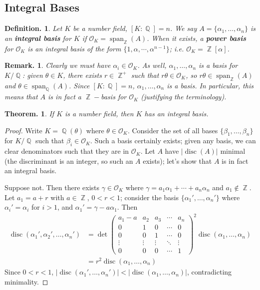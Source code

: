 \documentclass[11pt, a4paper]{memoir}
\DeclareMathOperator{\Q}{{\mathbb{Q}}}
\DeclareMathOperator{\Z}{{\mathbb{Z}}}
\theoremstyle{change}
\newtheorem{theorem}{Theorem.}[section]
\theoremstyle{plain}
\theoremstyle{nonumberplain}
\newtheorem{definition}{Definition.}
\newtheorem{remark}{Remark.}
\newtheorem{proof}{Proof}
\DeclareMathOperator{\disc}{disc}
\DeclareMathOperator{\spn}{span}
\newcommand{\mbf}[1]{{\boldmath\bfseries #1}}
\numberwithin{equation}{section}
\begin{document}
\subsection{Integral Bases}
\begin{definition}
    Let $K$ be a number field, $[K:\Q]=n$.
    We say $A=\{\alpha_1,\ldots,\alpha_n\}$ is an \mbf{integral basis} for $K$ if $\mathcal{O}_K=\spn_{\Z}(A)$.
    When it exists, a \mbf{power basis} for $\mathcal{O}_K$ is an integral basis of the form $\{1,\alpha,\cdots,\alpha^{n-1}\}$; i.e. $\mathcal{O}_K=\Z[\alpha]$.
\end{definition}
\begin{remark}
    Clearly we must have $\alpha_i\in\mathcal{O}_K$.
    As well, $\alpha_1,\ldots,\alpha_n$ is a basis for $K/\Q$: given $\theta\in K$, there exists $r\in\Z^+$ such that $r\theta\in\mathcal{O}_K$, so $r\theta\in\spn_{\Z}(A)$ and $\theta\in\spn_{\Q}(A)$.
    Since $[K:\Q]=n$, $\alpha_1,\ldots,\alpha_n$ is a basis.
    In particular, this means that $A$ is in fact a $\Z-$basis for $\mathcal{O}_K$ (justifying the terminology).
\end{remark}
\begin{theorem}
    If $K$ is a number field, then $K$ has an integral basis.
\end{theorem}
\begin{proof}
    Write $K=\Q(\theta)$ where $\theta\in\mathcal{O}_K$.
    Consider the set of all bases $\{\beta_1,\ldots,\beta_n\}$ for $K/\Q$ such that $\beta_i\in\mathcal{O}_K$.
    Such a basis certainly exists; given any basis, we can clear denominators such that they are in $\mathcal{O}_K$.
    Let $A$ have $|\disc(A)|$ minimal (the discriminant is an integer, so such an $A$ exists); let's show that $A$ is in fact an integral basis.

    Suppose not.
    Then there exists $\gamma\in\mathcal{O}_K$ where $\gamma=a_1\alpha_1+\cdots+a_n\alpha_n$ and $a_1\notin\Z$.
    Let $a_1=a+r$ with $a\in\Z$, $0<r<1$; consider the basis $\{\alpha_1',\ldots,\alpha_n'\}$ where $\alpha_i'=\alpha_i$ for $i>1$, and $\alpha_1'=\gamma-a\alpha_1$.
    Then
    \begin{align*}
        \disc(\alpha_1',\alpha_2',\ldots,\alpha_n') &= \det
        \begin{pmatrix}
            a_1-a&a_2&a_3&\cdots&a_n\\
            0&1&0&\cdots&0\\
            0&0&1&\cdots&0\\
            \vdots&\vdots&\vdots&\ddots&\vdots\\
            0&0&0&\cdots&1
        \end{pmatrix}^2\disc(\alpha_1,\ldots,\alpha_n)\\
        &= r^2\disc(\alpha_1,\ldots,\alpha_n)
    \end{align*}
    Since $0<r<1$, $|\disc(\alpha_1',\ldots,\alpha_n')|<|\disc(\alpha_1,\ldots,\alpha_n)|$, contradicting minimality.
\end{proof}
\end{document}
